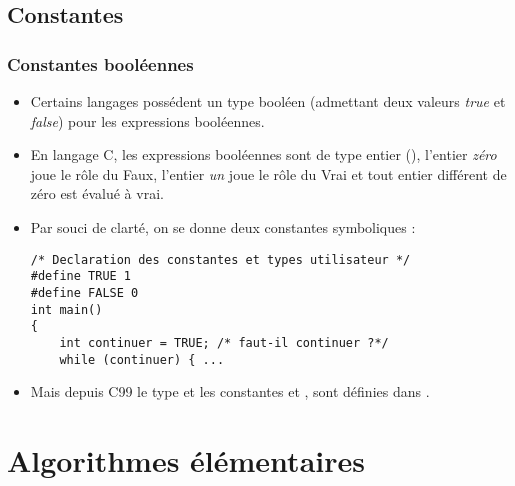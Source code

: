 \documentclass[xcolor=pdftex,svgnames,table]{beamer}
\begin{document}
\subsection{Constantes}
\begin{frame}[fragile]
  \frametitle{Constantes booléennes}
  \begin{itemize}
    \item
 Certains langages possédent un type booléen (admettant deux
  valeurs \emph{true} et \emph{false}) pour les expressions
  booléennes.\pause

\item En langage C, les
  expressions booléennes sont de type entier (), l'entier \emph{zéro}
  joue le rôle du Faux, l'entier \emph{un} joue le rôle du Vrai et tout
  entier différent de zéro est évalué à vrai.\pause

\item Par souci de clarté, on se donne deux
  constantes symboliques :
\begin{lstlisting}[escapechar={\%},basicstyle=\scriptsize\ttfamily]
/* Declaration des constantes et types utilisateur */
#define TRUE 1
#define FALSE 0
int main()
{
    int continuer = TRUE; /* faut-il continuer ?*/
    while (continuer) { ...
\end{lstlisting}\pause

\item Mais depuis C99 le type  et les constantes  et , sont définies dans .
  \end{itemize}
\end{frame}


\section{Algorithmes élémentaires}
\end{document}

